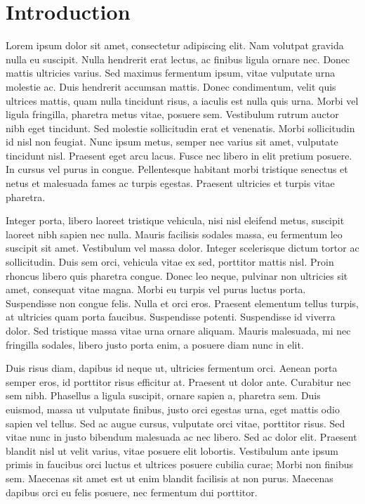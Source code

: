 \chapter{Introduction}

Lorem ipsum dolor sit amet, consectetur adipiscing elit. Nam volutpat gravida nulla eu suscipit. Nulla hendrerit erat lectus, ac finibus ligula ornare nec. Donec mattis ultricies varius. Sed maximus fermentum ipsum, vitae vulputate urna molestie ac. Duis hendrerit accumsan mattis. Donec condimentum, velit quis ultrices mattis, quam nulla tincidunt risus, a iaculis est nulla quis urna. Morbi vel ligula fringilla, pharetra metus vitae, posuere sem. Vestibulum rutrum auctor nibh eget tincidunt. Sed molestie sollicitudin erat et venenatis. Morbi sollicitudin id nisl non feugiat. Nunc ipsum metus, semper nec varius sit amet, vulputate tincidunt nisl. Praesent eget arcu lacus. Fusce nec libero in elit pretium posuere. In cursus vel purus in congue. Pellentesque habitant morbi tristique senectus et netus et malesuada fames ac turpis egestas. Praesent ultricies et turpis vitae pharetra.

Integer porta, libero laoreet tristique vehicula, nisi nisl eleifend metus, suscipit laoreet nibh sapien nec nulla. Mauris facilisis sodales massa, eu fermentum leo suscipit sit amet. Vestibulum vel massa dolor. Integer scelerisque dictum tortor ac sollicitudin. Duis sem orci, vehicula vitae ex sed, porttitor mattis nisl. Proin rhoncus libero quis pharetra congue. Donec leo neque, pulvinar non ultricies sit amet, consequat vitae magna. Morbi eu turpis vel purus luctus porta. Suspendisse non congue felis. Nulla et orci eros. Praesent elementum tellus turpis, at ultricies quam porta faucibus. Suspendisse potenti. Suspendisse id viverra dolor. Sed tristique massa vitae urna ornare aliquam. Mauris malesuada, mi nec fringilla sodales, libero justo porta enim, a posuere diam nunc in elit.

Duis risus diam, dapibus id neque ut, ultricies fermentum orci. Aenean porta semper eros, id porttitor risus efficitur at. Praesent ut dolor ante. Curabitur nec sem nibh. Phasellus a ligula suscipit, ornare sapien a, pharetra sem. Duis euismod, massa ut vulputate finibus, justo orci egestas urna, eget mattis odio sapien vel tellus. Sed ac augue cursus, vulputate orci vitae, porttitor risus. Sed vitae nunc in justo bibendum malesuada ac nec libero. Sed ac dolor elit. Praesent blandit nisl ut velit varius, vitae posuere elit lobortis. Vestibulum ante ipsum primis in faucibus orci luctus et ultrices posuere cubilia curae; Morbi non finibus sem. Maecenas sit amet est ut enim blandit facilisis at non purus. Maecenas dapibus orci eu felis posuere, nec fermentum dui porttitor.

